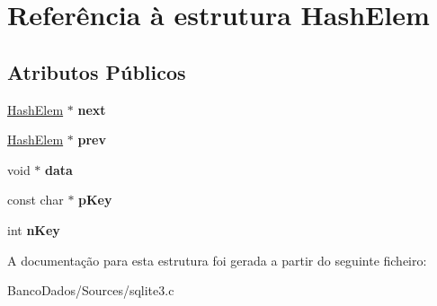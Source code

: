 \hypertarget{struct_hash_elem}{\section{Referência à estrutura Hash\-Elem}
\label{struct_hash_elem}
}
\subsection*{Atributos Públicos}
\begin{DoxyCompactItemize}
\item 
\hypertarget{struct_hash_elem_a2d28fad45ff21ffb8a02a7133df860fd}{\hyperlink{struct_hash_elem}{Hash\-Elem} $\ast$ {\bfseries next}}\label{struct_hash_elem_a2d28fad45ff21ffb8a02a7133df860fd}

\item 
\hypertarget{struct_hash_elem_ae4d011c0dc807a3c100ccdb927dd0ba9}{\hyperlink{struct_hash_elem}{Hash\-Elem} $\ast$ {\bfseries prev}}\label{struct_hash_elem_ae4d011c0dc807a3c100ccdb927dd0ba9}

\item 
\hypertarget{struct_hash_elem_ac7e80f63ba2f82457ff68aa0cd360365}{void $\ast$ {\bfseries data}}\label{struct_hash_elem_ac7e80f63ba2f82457ff68aa0cd360365}

\item 
\hypertarget{struct_hash_elem_a9c33a7c8ac467a5547a123338daf61f4}{const char $\ast$ {\bfseries p\-Key}}\label{struct_hash_elem_a9c33a7c8ac467a5547a123338daf61f4}

\item 
\hypertarget{struct_hash_elem_a12c1252e6aa2958f73e2ef969c9a3d81}{int {\bfseries n\-Key}}\label{struct_hash_elem_a12c1252e6aa2958f73e2ef969c9a3d81}

\end{DoxyCompactItemize}


A documentação para esta estrutura foi gerada a partir do seguinte ficheiro\-:\begin{DoxyCompactItemize}
\item 
Banco\-Dados/\-Sources/sqlite3.\-c\end{DoxyCompactItemize}
